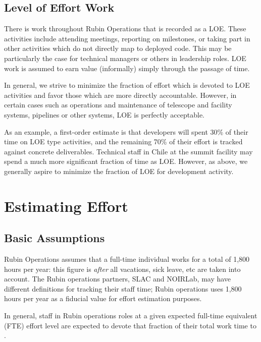 \subsection{Level of Effort Work}
\label{sec:loe}

There is work throughout Rubin Operations that is recorded as a \gls{LOE}. 
These activities include attending meetings, reporting on milestones, or taking part in other activities which do not directly map to deployed code.
This may be particularly the case for technical managers or others in leadership roles.
\gls{LOE} work is assumed to earn value (informally) simply through the passage of time.

In general, we strive to minimize the fraction of effort which is devoted to \gls{LOE} activities and favor those which are more directly accountable.
However, in certain cases such as operations and maintenance of telescope and facility systems, pipelines or other systems, \gls{LOE} is perfectly acceptable.

As an example, a first-order estimate is that developers will spent 30\% of their time on \gls{LOE} type activities, and the remaining 70\% of their effort is tracked against concrete deliverables. 
Technical staff in Chile at the summit facility may spend a much more significant fraction of time as  \gls{LOE}.
However, as above, we generally aspire to minimize the fraction of \gls{LOE} for development activity.


\section{Estimating Effort}
\label{sec:effort}

\subsection{Basic Assumptions}
Rubin Operations assumes that a full-time individual works for a total of 1,800 hours per year: this figure is \emph{after} all vacations, sick leave, etc are taken into account.
The Rubin operations partners, SLAC and NOIRLab, may have different definitions for tracking their staff time; Rubin operations uses 1,800 hours per year as a fiducial value for effort estimation purposes.

In general, staff in Rubin operations roles at a given expected full-time equivalent (FTE) effort level are expected to devote that fraction of their total work time to \RO.

